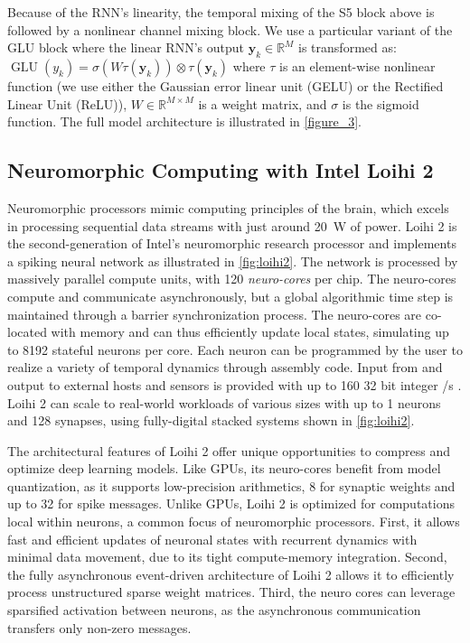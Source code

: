Because of the RNN's linearity, the temporal mixing of the S5 block above is followed by a nonlinear channel mixing block. We use a particular variant of the GLU block \cite{DBLP:conf/icml/DauphinFAG17} where the linear RNN's output $\mathbf{y}_k \in \mathbb{R}^M$ is transformed as:
$\mathop{GLU}(y_k) = \sigma \left( W \tau(\mathbf{y}_k) \right) \otimes \tau(\mathbf{y}_k)$
where $\tau$ is an element-wise nonlinear function (we use either the Gaussian error linear unit (GELU) or the Rectified Linear Unit (ReLU)), $W \in \mathbb{R}^{M \times M}$ is a weight matrix, and $\sigma$ is the sigmoid function. 
% 
The full model architecture is illustrated in \autoref{figure_3}.

\subsection{Neuromorphic Computing with Intel Loihi 2}

Neuromorphic processors mimic computing principles of the brain, which excels in processing sequential data streams with just around \qty{20}{\watt} of power.
Loihi 2 is the second-generation of Intel’s neuromorphic research processor \cite{DBLP:conf/sips/OrchardFRSSSD21} and implements a spiking neural network as illustrated in \autoref{fig:loihi2}.
The network is processed by massively parallel compute units, with 120 \textit{neuro-cores} per chip.
The neuro-cores compute and communicate asynchronously, but a global algorithmic time step is maintained through a barrier synchronization process.
The neuro-cores are co-located with memory and can thus efficiently update local states, simulating up to \qty{8192}{} stateful neurons per core.
Each neuron can be programmed by the user to realize a variety of temporal dynamics through assembly code.
Input from and output to external hosts and sensors is provided with up to \qty{160}{\million} 32 bit integer \unit{\messages/\second} \cite{shrestha_efficient_2024}.
Loihi 2 can scale to real-world workloads of various sizes with up to \qty{1}{\billion} neurons and \qty{128}{\billion} synapses, using fully-digital stacked systems shown in \autoref{fig:loihi2}.

The architectural features of Loihi 2 offer unique opportunities to compress and optimize deep learning models. Like GPUs, its neuro-cores benefit from model quantization, as it supports low-precision arithmetics, \qty{8}{\bit} for synaptic weights and up to \qty{32}{\bit} for spike messages. Unlike GPUs, Loihi 2 is optimized for computations local within neurons, a common focus of neuromorphic processors.
First, it allows fast and efficient updates of neuronal states with recurrent dynamics with minimal data movement, due to its tight compute-memory integration.
Second, the fully asynchronous event-driven architecture of Loihi 2 allows it to efficiently process unstructured sparse weight matrices.
Third, the neuro cores can leverage sparsified activation between neurons, as the asynchronous communication transfers only non-zero messages.
